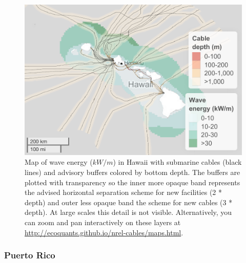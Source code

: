 \documentclass[]{article}
\begin{document}
\begin{figure}
\centering
\includegraphics{report_files/figure-latex/mapWaveHawaii-1.pdf}
\caption{\label{fig:mapWaveHawaii}Map of wave energy (\(kW/m\)) in Hawaii
with submarine cables (black lines) and advisory buffers colored by
bottom depth. The buffers are plotted with transparency so the inner
more opaque band represents the advised horizontal separation scheme for
new facilities (2 * depth) and outer less opaque band the scheme for new
cables (3 * depth). At large scales this detail is not visible.
Alternatively, you can zoom and pan interactively on these layers at
\url{http://ecoquants.github.io/nrel-cables/maps.html}.}
\end{figure}

\hypertarget{puerto-rico-1}{%
\subsubsection{Puerto Rico}\label{puerto-rico-1}}
\end{document}
